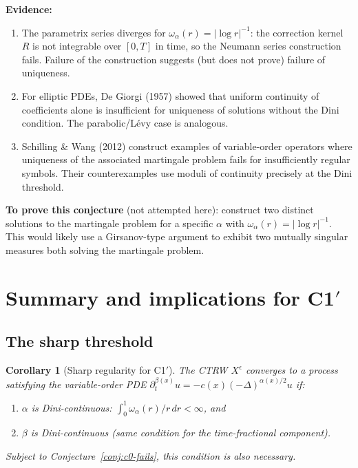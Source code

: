 \documentclass{amsart}
\newtheorem{corollary}[theorem]{Corollary}
\theoremstyle{definition}
\begin{document}
\textbf{Evidence:}
\begin{enumerate}
    \item The parametrix series diverges for $\omega_\alpha(r)=|\log r|^{-1}$:
          the correction kernel $R$ is not integrable over $[0,T]$ in time,
          so the Neumann series construction fails. Failure of the construction
          suggests (but does not prove) failure of uniqueness.

    \item For elliptic PDEs, De Giorgi (1957) showed that uniform continuity of
          coefficients alone is insufficient for uniqueness of solutions without
          the Dini condition. The parabolic/Lévy case is analogous.

    \item Schilling \& Wang (2012) construct examples of variable-order operators
          where uniqueness of the associated martingale problem fails for
          insufficiently regular symbols. Their counterexamples use moduli of
          continuity precisely at the Dini threshold.
\end{enumerate}

\textbf{To prove this conjecture} (not attempted here): construct two distinct
solutions to the martingale problem for a specific $\alpha$ with $\omega_\alpha(r)=|\log r|^{-1}$.
This would likely use a Girsanov-type argument to exhibit two mutually singular
measures both solving the martingale problem.

\section{Summary and implications for C1$'$}

\subsection{The sharp threshold}

\begin{corollary}[Sharp regularity for C1$'$]
The CTRW $X^\epsilon$ converges to a process satisfying the variable-order PDE
$\partial_t^{\beta(x)}u = -c(x)(-\Delta)^{\alpha(x)/2}u$ if:
\begin{enumerate}
    \item[(S)] $\alpha$ is Dini-continuous: $\int_0^1\omega_\alpha(r)/r\,dr<\infty$, and
    \item[(S)] $\beta$ is Dini-continuous (same condition for the time-fractional component).
\end{enumerate}
Subject to Conjecture~\ref{conj:c0-fails}, this condition is also necessary.
\end{corollary}
\end{document}

